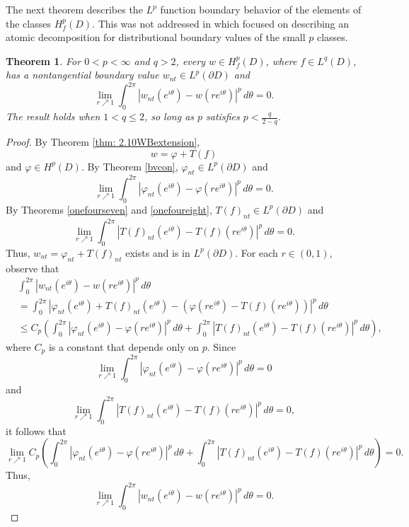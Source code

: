 \documentclass[suppldata]{interact}
\theoremstyle{plain}%
\newtheorem{theorem}{Theorem}[section]
\theoremstyle{definition}
\theoremstyle{remark}
\newcommand{\p}{\partial}
\begin{document}
The next theorem describes the $L^p$ function boundary behavior of the elements of the classes $H^p_f(D)$. This was not addressed in \cite{WB} which focused on describing an atomic decomposition for distributional boundary values of the small $p$ classes. 

\begin{theorem}\label{thm: nonhomogHpbvcon}
For $0 < p < \infty$ and $q>2$, every $w \in H^p_f(D)$, where $f \in L^q(D)$, has a nontangential boundary value $w_{nt} \in L^p(\p D)$ and 
\[
\lim_{r \nearrow 1} \int_0^{2\pi} |w_{nt}(e^{i\theta}) - w(re^{i\theta}) |^p \, d\theta  = 0.
\]
The result holds when $1 < q \leq 2$, so long as $p$ satisfies $p < \frac{q}{2-q}$. 
\end{theorem}

\begin{proof}
    By Theorem \ref{thm: 2.10WBextension}, 
    \[
        w = \varphi + T(f)
    \]
    and $\varphi \in H^p(D)$. By Theorem \ref{bvcon}, $\varphi_{nt} \in L^p(\p D)$ and 
    \[
        \lim_{r \nearrow 1} \int_0^{2\pi} |\varphi_{nt}(e^{i\theta}) - \varphi(re^{i\theta}) |^p \, d\theta  = 0.
    \]
    By Theorems \ref{onefourseven} and \ref{onefoureight}, $T(f)_{nt}\in L^p(\p D)$ and 
    \[
        \lim_{r \nearrow 1} \int_0^{2\pi} |T(f)_{nt}(e^{i\theta}) - T(f)(re^{i\theta}) |^p \, d\theta  = 0.
    \]
    Thus, $w_{nt} = \varphi_{nt} + T(f)_{nt}$ exists and is in $L^p(\p D)$. For each $r \in (0,1)$, observe that 
    \begin{align*}
        &\int_0^{2\pi} |w_{nt}(e^{i\theta}) - w(re^{i\theta}) |^p \, d\theta\\
        &= \int_0^{2\pi} |\varphi_{nt}(e^{i\theta}) + T(f)_{nt}(e^{i\theta})- (\varphi(re^{i\theta})-T(f)(re^{i\theta})) |^p \, d\theta\\
        &\leq C_p\left(\int_0^{2\pi} |\varphi_{nt}(e^{i\theta}) - \varphi(re^{i\theta})|^p\,d\theta + \int_0^{2\pi} |T(f)_{nt}(e^{i\theta})-T(f)(re^{i\theta}) |^p \, d\theta \right),
    \end{align*}
    where $C_p$ is a constant that depends only on $p$. Since 
    \[
        \lim_{r \nearrow 1} \int_0^{2\pi} |\varphi_{nt}(e^{i\theta}) - \varphi(re^{i\theta}) |^p \, d\theta  = 0
    \]
    and
    \[
        \lim_{r \nearrow 1} \int_0^{2\pi} |T(f)_{nt}(e^{i\theta}) - T(f)(re^{i\theta}) |^p \, d\theta  = 0,
    \]
    it follows that 
    \[
        \lim_{r \nearrow 1} C_p\left(\int_0^{2\pi} |\varphi_{nt}(e^{i\theta}) - \varphi(re^{i\theta})|^p\,d\theta + \int_0^{2\pi} |T(f)_{nt}(e^{i\theta})-T(f)(re^{i\theta}) |^p \, d\theta \right) = 0.
    \]
    Thus, 
    \[
        \lim_{ r \nearrow 1} \int_0^{2\pi} |w_{nt}(e^{i\theta}) - w(re^{i\theta}) |^p \, d\theta = 0.
    \]
\end{proof}
\end{document}
